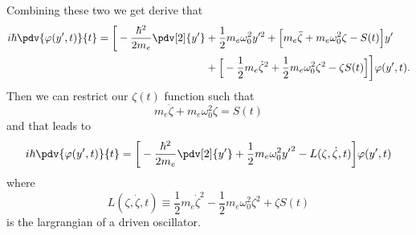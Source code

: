 Combining these two we get derive that
\begin{equation} \label{1.39}
  \begin{aligned}
    i \hbar \pdv{\varphi(y',t)}{t}   =
    \bigg[
        -  \frac{\hbar^2}{2m_e}\pdv[2]{{y'}}
        & + \frac{1}{2} m_e \omega_0^2 y'^2 +
        \Big[
            m_e\ddot{\zeta} + m_e\omega_0^2\zeta - S(t)
        \Big]y' \\
        &
        +
        \Big[
            - \frac{1}{2} m_e\dot{\zeta}^2 + \frac{1}{2}m_e\omega_0^2 \zeta^2 - \zeta S(t)
        \Big]
    \bigg]\varphi(y',t).
  \end{aligned}
\end{equation}
Then we can restrict our $\zeta(t)$ function such that
\begin{equation} \label{1.40}
  m_e\ddot{\zeta} + m_e\omega_0^2\zeta = S(t)
\end{equation}
and that leads to
\begin{equation} \label{1.41}
  \begin{aligned}
    i \hbar \pdv{\varphi(y',t)}{t}   =
    \bigg[
        -  \frac{\hbar^2}{2m_e}\pdv[2]{{y'}}
        + \frac{1}{2} m_e \omega_0^2 {y'}^2
        - L(\zeta,\dot{\zeta},t)
    \bigg]\varphi(y',t)
  \end{aligned}
\end{equation}
where
\begin{equation} \label{1.42}
  L(\zeta,\dot{\zeta},t) \equiv \frac{1}{2} m_e\dot{\zeta}^2 - \frac{1}{2}m_e\omega_0^2 \zeta^2 + \zeta S(t)
\end{equation}
is the largrangian of a driven oscillator.

